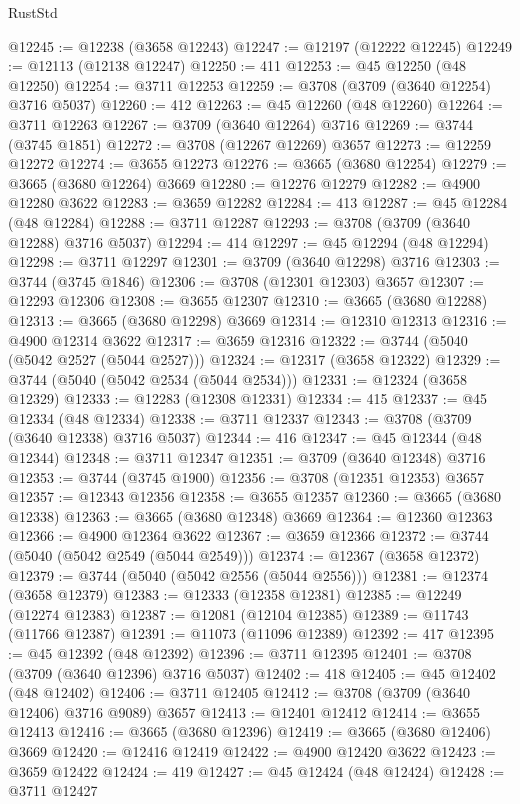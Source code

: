 \begin{lexlean}{RustStd}
\begin{coremodule}
@12245 := @12238 (@3658 @12243)
@12247 := @12197 (@12222 @12245)
@12249 := @12113 (@12138 @12247)
@12250 := 411
@12253 := @45 @12250 (@48 @12250)
@12254 := @3711 @12253
@12259 := @3708 (@3709 (@3640 @12254) @3716 @5037)
@12260 := 412
@12263 := @45 @12260 (@48 @12260)
@12264 := @3711 @12263
@12267 := @3709 (@3640 @12264) @3716
@12269 := @3744 (@3745 @1851)
@12272 := @3708 (@12267 @12269) @3657
@12273 := @12259 @12272
@12274 := @3655 @12273
@12276 := @3665 (@3680 @12254)
@12279 := @3665 (@3680 @12264) @3669
@12280 := @12276 @12279
@12282 := @4900 @12280 @3622
@12283 := @3659 @12282
@12284 := 413
@12287 := @45 @12284 (@48 @12284)
@12288 := @3711 @12287
@12293 := @3708 (@3709 (@3640 @12288) @3716 @5037)
@12294 := 414
@12297 := @45 @12294 (@48 @12294)
@12298 := @3711 @12297
@12301 := @3709 (@3640 @12298) @3716
@12303 := @3744 (@3745 @1846)
@12306 := @3708 (@12301 @12303) @3657
@12307 := @12293 @12306
@12308 := @3655 @12307
@12310 := @3665 (@3680 @12288)
@12313 := @3665 (@3680 @12298) @3669
@12314 := @12310 @12313
@12316 := @4900 @12314 @3622
@12317 := @3659 @12316
@12322 := @3744 (@5040 (@5042 @2527 (@5044 @2527)))
@12324 := @12317 (@3658 @12322)
@12329 := @3744 (@5040 (@5042 @2534 (@5044 @2534)))
@12331 := @12324 (@3658 @12329)
@12333 := @12283 (@12308 @12331)
@12334 := 415
@12337 := @45 @12334 (@48 @12334)
@12338 := @3711 @12337
@12343 := @3708 (@3709 (@3640 @12338) @3716 @5037)
@12344 := 416
@12347 := @45 @12344 (@48 @12344)
@12348 := @3711 @12347
@12351 := @3709 (@3640 @12348) @3716
@12353 := @3744 (@3745 @1900)
@12356 := @3708 (@12351 @12353) @3657
@12357 := @12343 @12356
@12358 := @3655 @12357
@12360 := @3665 (@3680 @12338)
@12363 := @3665 (@3680 @12348) @3669
@12364 := @12360 @12363
@12366 := @4900 @12364 @3622
@12367 := @3659 @12366
@12372 := @3744 (@5040 (@5042 @2549 (@5044 @2549)))
@12374 := @12367 (@3658 @12372)
@12379 := @3744 (@5040 (@5042 @2556 (@5044 @2556)))
@12381 := @12374 (@3658 @12379)
@12383 := @12333 (@12358 @12381)
@12385 := @12249 (@12274 @12383)
@12387 := @12081 (@12104 @12385)
@12389 := @11743 (@11766 @12387)
@12391 := @11073 (@11096 @12389)
@12392 := 417
@12395 := @45 @12392 (@48 @12392)
@12396 := @3711 @12395
@12401 := @3708 (@3709 (@3640 @12396) @3716 @5037)
@12402 := 418
@12405 := @45 @12402 (@48 @12402)
@12406 := @3711 @12405
@12412 := @3708 (@3709 (@3640 @12406) @3716 @9089) @3657
@12413 := @12401 @12412
@12414 := @3655 @12413
@12416 := @3665 (@3680 @12396)
@12419 := @3665 (@3680 @12406) @3669
@12420 := @12416 @12419
@12422 := @4900 @12420 @3622
@12423 := @3659 @12422
@12424 := 419
@12427 := @45 @12424 (@48 @12424)
@12428 := @3711 @12427

\end{coremodule}
\end{lexlean}
